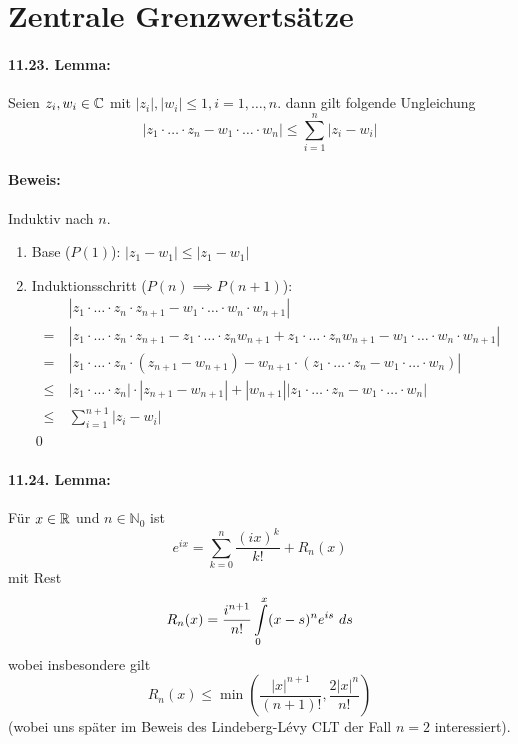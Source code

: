 \documentclass[11pt]{report}
\begin{document}
 \section*{Zentrale Grenzwerts\"atze}
 \paragraph{11.23. Lemma:}Seien $z_i,w_i\in\mathbb{C}$ mit $|z_i|,|w_i|\leq1,i=1,\hdots,n$. dann gilt folgende Ungleichung
 $$|z_1\cdot\hdots\cdot z_n-w_1\cdot\hdots\cdot w_n|\leq\sum_{i=1}^n|z_i-w_i|$$
 
 \paragraph{Beweis:}Induktiv nach $n$.
 \begin{enumerate}
     \item Base ($P(1)$): $|z_1-w_1|\leq|z_1-w_1|$
     \item Induktionsschritt ($P(n)\implies P(n+1)$): 
     \begin{align*}
         &|z_1\cdot\hdots\cdot z_n\cdot z_{n+1}-w_1\cdot\hdots\cdot w_n\cdot w_{n+1}|\\
         =\ &|z_1\cdot\hdots\cdot z_n\cdot z_{n+1}-z_1\cdot\hdots\cdot z_nw_{n+1}+z_1\cdot\hdots\cdot z_nw_{n+1}-w_1\cdot\hdots\cdot w_n\cdot w_{n+1}|\\
         =\ &|z_1\cdot\hdots\cdot z_n\cdot(z_{n+1}-w_{n+1})-w_{n+1}\cdot(z_1\cdot\hdots\cdot z_n-w_1\cdot\hdots\cdot w_n)| \\
         \leq\ &|z_1\cdot\hdots\cdot z_n|\cdot|z_{n+1}-w_{n+1}|+|w_{n+1}||z_1\cdot\hdots\cdot z_n-w_1\cdot\hdots\cdot w_n| \\
         \leq\ &\sum_{i=1}^{n+1}|z_i-w_i|  
     \end{align*}
     \qed
 \end{enumerate}
 
 \paragraph{11.24. Lemma:} F\"ur $x\in\mathbb{R}$ und $n\in\mathbb{N}_0$ ist 
 $$e^{ix}=\sum_{k=0}^n\dfrac{(ix)^k}{k!}+R_n(x)$$
 mit Rest
 $$R_n(x)=\dfrac{i^{n+1}}{n!}\int\displaylimits_0^x(x-s)^ne^{is}\ ds$$
 wobei insbesondere gilt
 $$R_n(x)\leq\min\left(\dfrac{|x|^{n+1}}{(n+1)!},\dfrac{2|x|^n}{n!}\right)$$
 (wobei uns sp\"ater im Beweis des Lindeberg-L\'evy CLT der Fall $n=2$ interessiert).
 
\end{document}
